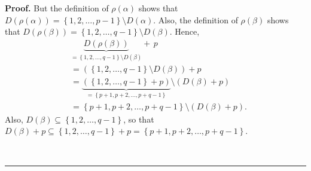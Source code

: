 \documentclass
[numbers=enddot,12pt,final,onecolumn,notitlepage,abstracton]{scrartcl}%
\theoremstyle{definition}
\newenvironment{proof}[1][Proof]{\noindent\textbf{#1.} }{\ \rule{0.5em}{0.5em}}
\newenvironment{verlong}{}{}
\begin{document}
\begin{verlong}
\begin{proof}
But the definition of $\rho\left(  \alpha\right)  $ shows that $D\left(
\rho\left(  \alpha\right)  \right)  =\left\{  1,2,\ldots,p-1\right\}
\setminus D\left(  \alpha\right)  $. Also, the definition of $\rho\left(
\beta\right)  $ shows that $D\left(  \rho\left(  \beta\right)  \right)
=\left\{  1,2,\ldots,q-1\right\}  \setminus D\left(  \beta\right)  $. Hence,%
\begin{align*}
&  \underbrace{D\left(  \rho\left(  \beta\right)  \right)  }_{=\left\{
1,2,\ldots,q-1\right\}  \setminus D\left(  \beta\right)  }+\,p\\
&  =\left(  \left\{  1,2,\ldots,q-1\right\}  \setminus D\left(  \beta\right)
\right)  +p\\
&  =\underbrace{\left(  \left\{  1,2,\ldots,q-1\right\}  +p\right)
}_{=\left\{  p+1,p+2,\ldots,p+q-1\right\}  }\setminus\left(  D\left(
\beta\right)  +p\right) \\
&  =\left\{  p+1,p+2,\ldots,p+q-1\right\}  \setminus\left(  D\left(
\beta\right)  +p\right)  .
\end{align*}
Also, $D\left(  \beta\right)  \subseteq\left\{  1,2,\ldots,q-1\right\}  $, so
that $D\left(  \beta\right)  +p\subseteq\left\{  1,2,\ldots,q-1\right\}
+p=\left\{  p+1,p+2,\ldots,p+q-1\right\}  $.


\end{proof}
\end{verlong}
\end{document}

